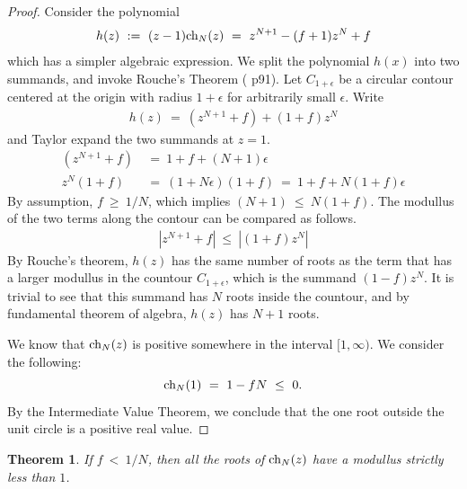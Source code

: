 \documentclass[11pt,reqno]{amsart}
\numberwithin{equation}{section}
\theoremstyle{plain}
\newtheorem{theorem}[thm]{Theorem}
\newcommand{\ch}{\textnormal{ch}}
\begin{document}
\begin{proof}
    Consider the polynomial 
    \begin{align}
        h(z) \ := \ (z - 1) \ch_N(z) \ = \ z^{N + 1} - (f+1) z^N + f
    \end{align}
    which has a simpler algebraic expression. 
    We split the 
    polynomial $h(x)$ into two summands, and invoke Rouche's Theorem (\cite{SS03} p91). 
    Let $C_{1 + \epsilon}$ be a circular contour centered at the origin 
    with radius $1 + \epsilon$ for arbitrarily small $\epsilon$. 
    Write 
    \begin{align}
        h(z) \ = \ (z^{N + 1} + f) + (1 + f)z^N 
    \end{align}
    and Taylor expand the two summands at $z = 1$. 
    \begin{align}
        (z^{N + 1} + f) &\ = \ 1 + f + (N + 1) \epsilon \\ 
        z^N(1 + f) &\ = \ (1 + N \epsilon)  (1 + f) \ = \ 1 + f + N(1 + f)\epsilon
    \end{align}
    By assumption, $f \ \geq \ 1/N$, which implies $(N + 1) \ \leq \ N(1 + f)$. 
    The modullus of the two terms along the contour can be compared 
    as follows. 
    \begin{align}
        \left|z^{N + 1} + f\right| \ \leq \ \left|(1 + f)z^N\right|
    \end{align}
    By Rouche's theorem, $h(z)$ has the same number of roots as the 
    term that has a larger modullus in the countour $C_{1 + \epsilon}$, which is the 
    summand $(1-f)z^N$. It is trivial to see that this summand has $N$ 
    roots inside the countour, and by fundamental theorem of algebra, 
    $h(z)$ has $N + 1$ roots. 

    We know that $\ch_N(z)$ is positive somewhere in the interval $[1, \infty)$. 
    We consider the following:
    \begin{equation}
        \ch_N(1) \ =\  1 - fN \ \leq \ 0.  
    \end{equation}
    By the Intermediate Value Theorem, we conclude that the one root outside 
    the unit circle is a positive real value. 
\end{proof}

\begin{theorem}
    If $f \ < \ 1/N$, then all the roots of $\ch_N(z)$ have 
    a modullus strictly less than $1$. 
\end{theorem}
\end{document}
